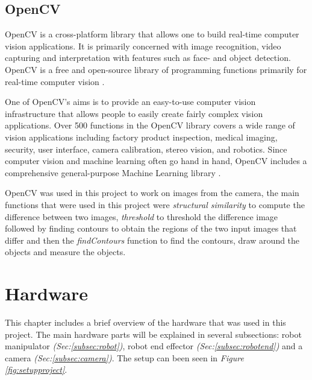 \subsection{OpenCV}
OpenCV is a cross-platform library that allows one to build real-time computer vision applications. It is primarily concerned with image recognition, video capturing and interpretation with features such as face- and object detection. OpenCV is a free and open-source library of programming functions primarily for real-time computer vision \cite{noauthor_opencv_nodate}.

One of OpenCV's aims is to provide an easy-to-use computer vision infrastructure that allows people to easily create fairly complex vision applications. Over 500 functions in the OpenCV library covers a wide range of vision applications including factory product inspection, medical imaging, security, user interface, camera calibration, stereo vision, and robotics. Since computer vision and machine learning often go hand in hand, OpenCV includes a comprehensive general-purpose Machine Learning library \cite{kaehler_what_2016}.


OpenCV was used in this project to work on images from the camera, the main functions that were used in this project were \textit{structural similarity} to compute the difference between two images, \textit{threshold} to threshold the difference image followed by finding contours to obtain the regions of the two input images that differ and then the \textit{findContours} function to find the contours, draw around the objects and measure the objects.

\clearpage
\section{Hardware \label{sec:hardware}}
This chapter includes a brief overview of the hardware that was used in this project. The main hardware parts will be explained in several subsections: robot manipulator \textit{(Sec:\ref{subsec:robot})}, robot end effector \textit{(Sec:\ref{subsec:robotend})} and a camera \textit{(Sec:\ref{subsec:camera})}. The setup can been seen in \textit{Figure \ref{fig:setupproject}}.

